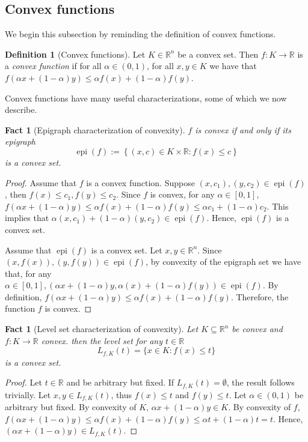 \documentclass[smallextended,numbook,nospthms]{svjour3}
\theoremstyle{plain}
\newtheorem{fact}[theorem]{Fact}
\theoremstyle{definition}
\newtheorem{definition}[theorem]{Definition}
\def\RR{\mathds R}
\DeclareMathOperator{\epi}{epi}
\begin{document}
\subsection{Convex functions}

We begin this subsection by reminding the definition of convex functions.
\begin{definition}[Convex functions]\label{def:convex f}
	Let $K \in \RR^n$ be a convex set. Then $f:K \rightarrow \RR$ is a \emph{convex function} if for all $\alpha \in (0,1)$, for all $x, y \in K$ we have that $f\left(\alpha x+(1-\alpha) y\right) \leq \alpha f\left(x\right)+(1-\alpha) f\left(y\right)$.
\end{definition}

Convex functions have many useful characterizations, some of which we now describe.

\begin{fact}[Epigraph characterization of convexity]\label{fact:conv char epi}
$f$ is convex if and only if its epigraph
$$
\epi(f):=\left\{(x, c) \in K \times \RR: f(x) \leq c\right\}
$$
is a convex set.
\end{fact}
\begin{proof}
	Assume that $f$ is a convex function. Suppose $\left(x, c_{1}\right),\left(y, c_{2}\right) \in \operatorname{epi}(f)$, then $f(x) \leq c_{1}, f(y) \leq c_{2}$. Since $f$ is convex, for any $\alpha \in[0,1]$, $f(\alpha x+(1-\alpha) y) \leq \alpha f(x)+(1-\alpha) f(y) \leq \alpha c_{1}+(1-\alpha) c_{2}$. This implies that $\alpha\left(x, c_{1}\right)+(1-\alpha)\left(y, c_{2}\right) \in \epi (f)$. Hence, $\epi(f)$ is a convex set.
	
	Assume that $\epi(f)$ is a convex set. Let $x, y \in \RR^{n}$. Since $(x, f(x)),(y, f(y)) \in \epi(f)$, by convexity of the epigraph set we have that, for any $\alpha \in[0,1],(\alpha x+(1-\alpha) y, \alpha(x)+(1-\alpha) f(y)) \in \epi(f)$. By definition, $f(\alpha x+(1-\alpha) y) \leq \alpha f(x)+(1-\alpha) f(y)$. Therefore, the function $f$ is convex.
\end{proof}


\begin{fact}[Level set characterization of convexity]\label{fact:conv level set}
	Let $K \subseteq \RR^n$ be convex and $f:K \rightarrow \RR$ convex. then the level set for any $t \in \RR$
	$$
	L_{f,K}(t)=\{x \in K: f(x) \leq t\}
	$$
	is a convex set.
\end{fact}
\begin{proof}
	Let $t \in \RR$ and be arbitrary but fixed. If $L_{f,K}(t) = \emptyset$, the result follows trivially.
	Let $x,y \in L_{f,K}(t)$, thus $f(x) \leq t$ and $f(y) \leq t$. Let $\alpha \in (0,1)$ be arbitrary but fixed.
	By convexity of $K$,  $\alpha x + (1-\alpha)y \in K$. By convexity of $f$, $f(\alpha x + (1-\alpha)y) \leq \alpha f(x) + (1-\alpha) f(y) \leq \alpha t + (1-\alpha) t = t$. Hence, $(\alpha x + (1-\alpha)y) \in L_{f,K}(t)$.
\end{proof}
\end{document}
